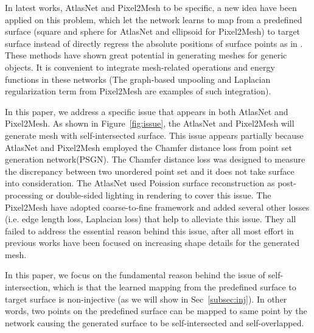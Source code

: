 In latest works, AtlasNet\cite{atlasnet} and Pixel2Mesh\cite{pixel2mesh} to be specific, a new idea have been applied on this problem, which let the network learns to map from a predefined surface (square and sphere for AtlasNet and ellipsoid for Pixel2Mesh) to target surface instead of directly regress the absolute positions of surface points as in \cite{PSGN}. These methods have shown great potential in generating meshes for generic objects. It is convenient to integrate mesh-related operations and energy functions in these networks (The graph-based unpooling and Laplacian regularization term from Pixel2Mesh are examples of such integration).

In this paper, we address a specific issue that appears in both AtlasNet\cite{atlasnet} and Pixel2Mesh\cite{pixel2mesh}. As shown in Figure~\ref{fig:issue}, the AtlasNet and Pixel2Mesh will generate mesh with self-intersected surface. This issue appears partially because AtlasNet and Pixel2Mesh employed the Chamfer distance loss from point set generation network(PSGN)\cite{PSGN}. The Chamfer distance loss was designed to measure the discrepancy between two unordered point set and it does not take surface into consideration. The AtlasNet used Poission surface reconstruction as post-processing or double-sided lighting in rendering to cover this issue. The Pixel2Mesh have adopted coarse-to-fine framework and added several other losses (i.e. edge length loss, Laplacian loss) that help to alleviate this issue. They all failed to address the essential reason behind this issue, after all most effort in previous works have been focused on increasing shape details for the generated mesh.

In this paper, we focus on the fundamental reason behind the issue of self-intersection, which is that the learned mapping from the predefined surface to target surface is non-injective (as we will show in Sec~\ref{subsec:inj}). In other words, two points on the predefined surface can be mapped to same point by the network causing the generated surface to be self-intersected and self-overlapped. 

